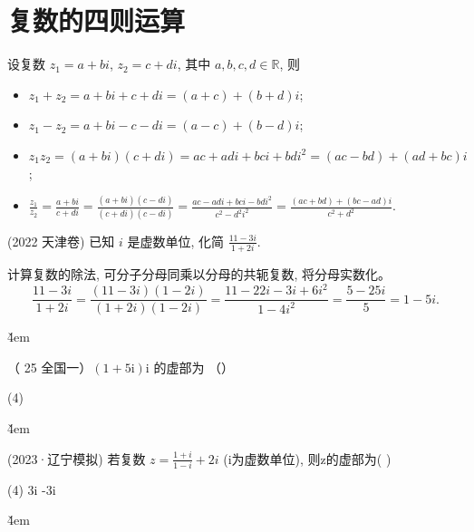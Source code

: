 
\section{复数的四则运算}

\begin{theorem}[复数的四则运算]
    设复数 $z_{1}=a+bi$, $z_{2}=c+di$, 其中 $a,b,c,d\in \mathbb{R}$, 则
    \begin{itemize}
        \item[①] $z_{1}+z_{2}=a+bi+c+di=(a+c)+(b+d)i$;
        \item[②] $z_{1}-z_{2}=a+bi-c-di=(a-c)+(b-d)i$;
        \item[③] $z_{1}z_{2}=(a+bi)(c+di)=ac+adi+bci+bdi^{2}=(ac-bd)+(ad+bc)i$;
        \item[④] $\frac{z_{1}}{z_{2}}=\frac{a+bi}{c+di}=\frac{(a+bi)(c-di)}{(c+di)(c-di)}=\frac{ac-adi+bci-bdi^{2}}{c^{2}-d^{2}i^{2}}=\frac{(ac+bd)+(bc-ad)i}{c^{2}+d^{2}}.$
    \end{itemize}
\end{theorem}

\begin{example}(2022 天津卷)
    已知 $i$ 是虚数单位, 化简 $\frac{11-3i}{1+2i}$.
    \begin{solution}
        计算复数的除法, 可分子分母同乘以分母的共轭复数, 将分母实数化。
        \[
            \frac{11-3i}{1+2i}=\frac{(11-3i)(1-2i)}{(1+2i)(1-2i)}=\frac{11-22i-3i+6i^{2}}{1-4i^{2}}=\frac{5-25i}{5}=1-5i.
        \]
    \end{solution}
\end{example}

\v{4em}

\begin{example}
    （ 25 全国一）$(1+5 \mathrm{i}) \mathrm{i}$ 的虚部为 （\qquad）
    \begin{tasks}(4)
    \end{tasks}
\end{example}

\v{4em}

\begin{example}(2023·辽宁模拟)
    若复数 $z=\frac{1+i}{1-i}+2i$ (i为虚数单位), 则z的虚部为( \quad )
    \begin{tasks}(4)
        \task 3i
        \task -3i
    \end{tasks}
\end{example}

\v{4em}

